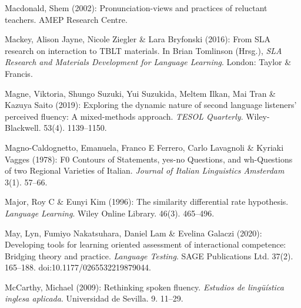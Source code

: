 \begin{styleBibliography}
Macdonald, Shem (2002): Pronunciation-views and practices of reluctant teachers. AMEP Research Centre.
\end{styleBibliography}

\begin{styleBibliography}
Mackey, Alison Jayne, Nicole Ziegler \& Lara Bryfonski (2016): From SLA research on interaction to TBLT materials. In Brian Tomlinson (Hrsg.), \textit{SLA Research and Materials Development for Language Learning}. London: Taylor \& Francis.
\end{styleBibliography}

\begin{styleBibliography}
Magne, Viktoria, Shungo Suzuki, Yui Suzukida, Meltem Ilkan, Mai Tran \& Kazuya Saito (2019): Exploring the dynamic nature of second language listeners’ perceived fluency: A mixed-methods approach. \textit{TESOL Quarterly}. Wiley-Blackwell. 53(4). 1139–1150.
\end{styleBibliography}

\begin{styleBibliography}
Magno-Caldognetto, Emanuela, Franco E Ferrero, Carlo Lavagnoli \& Kyriaki Vagges (1978): F0 Contours of Statements, yes-no Questions, and wh-Questions of two Regional Varieties of Italian. \textit{Journal of Italian Linguistics Amsterdam} 3(1). 57–66.
\end{styleBibliography}

\begin{styleBibliography}
Major, Roy C \& Eunyi Kim (1996): The similarity differential rate hypothesis. \textit{Language Learning}. Wiley Online Library. 46(3). 465–496.
\end{styleBibliography}

\begin{styleBibliography}
May, Lyn, Fumiyo Nakatsuhara, Daniel Lam \& Evelina Galaczi (2020): Developing tools for learning oriented assessment of interactional competence: Bridging theory and practice. \textit{Language Testing}. SAGE Publications Ltd. 37(2). 165–188. doi:10.1177/0265532219879044.
\end{styleBibliography}

\begin{styleBibliography}
McCarthy, Michael (2009): Rethinking spoken fluency. \textit{Estudios de lingüística inglesa aplicada}. Universidad de Sevilla. 9. 11–29.
\end{styleBibliography}


